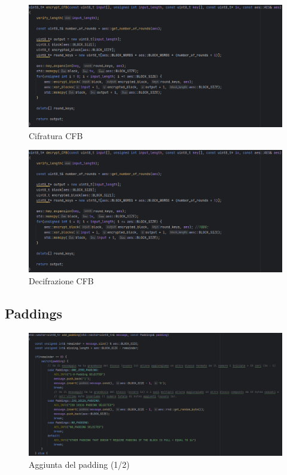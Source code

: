 \begin{figure}[H]
	\centering
	\includegraphics[width=1\textwidth, height=1\textheight, keepaspectratio]{./images/code/cpp/modes/encrypt_CFB.PNG}
	\caption{Cifratura CFB}
	\label{fig:encrypt_CFB}
\end{figure}

\textsf{\small }

\begin{figure}[H]
	\centering
	\includegraphics[width=1\textwidth, height=1\textheight, keepaspectratio]{./images/code/cpp/modes/decrypt_CFB.PNG}
	\caption{Decifrazione CFB}
	\label{fig:decrypt_CFB}
\end{figure}

\subsection{Paddings}

\textsf{\small } %

\begin{figure}[H]
	\centering
	\includegraphics[width=1\textwidth, height=1\textheight, keepaspectratio]{./images/code/cpp/padding/add_padding0.PNG}
	\caption{Aggiunta del padding (1/2)}
	\label{fig:add_padding0}
\end{figure}

